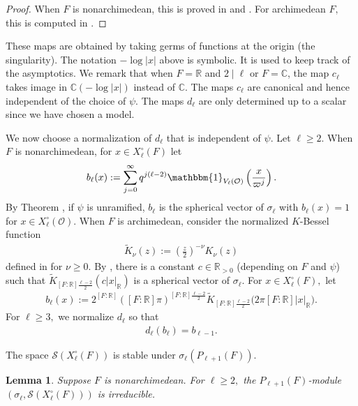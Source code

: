 \documentclass[11pt,a4paper,reqno]{amsart}
\newtheorem{lem}[thm]{Lemma}
\theoremstyle{remark}
\numberwithin{equation}{section}
\newcommand{\OO}{\mathcal{O}}
\newcommand{\CC}{\mathbb{C}}
\newcommand{\RR}{\mathbb{R}}
\theoremstyle{definition}
\numberwithin{equation}{section}
\newcommand{\one}{\mathbbm{1}}
\begin{document}
\begin{proof}
    When $F$ is nonarchimedean, this is proved in \cite{GK:cone} and \cite[Example 4.4.2]{Hsu:asymptotics}. For archimedean $F,$ this is computed in \cite[Example 5.4.2 and \S 5.5]{Hsu:asymptotics}.
\end{proof}

These maps are obtained by taking germs of functions at the origin (the singularity).  The notation $-\log |x|$ above is symbolic. It is used to keep track of the asymptotics. We remark that when $F=\RR$ and $2\mid \ell$ or $F=\CC$, the map $c_\ell$ takes image in $\CC(-\log |x|)$ instead of $\CC$. The maps $c_\ell$ are canonical and hence independent of the choice of $\psi$. The maps $d_\ell$ are only determined up to a scalar since we have chosen a model.

We now choose a normalization of $d_\ell$ that is independent of $\psi$. Let $\ell\ge 2$. When $F$ is nonarchimedean,  for $x\in X_\ell^\circ(F)$ let
\begin{align}\label{eq:basicnonarch}
    b_\ell(x):=\sum_{j=0}^\infty q^{j(\ell-2)}\one_{V_\ell(\OO)}\left(\frac{x}{\varpi^j} \right).
\end{align}
By Theorem \cite[Theorem 6.1]{SW:minimal}, if $\psi$ is unramified, $b_\ell$ is the spherical vector of $\sigma_\ell$ with $b_\ell(x)=1$ for $x\in X_\ell^\circ(\mathcal{O}).$
When $F$ is archimedean, consider the normalized  $K$-Bessel function
\begin{align*}
    \widetilde{K}_{\nu}(z):=\left(\frac{z}{2}\right)^{-\nu}K_{\nu}(z)
\end{align*}
defined in \cite[\S 7.2]{Kobayashi:Mano} for $\nu\ge 0$. By \cite[(2.14) and Theorem 2.19]{minrep:real}, there is a constant $c\in \RR_{>0}$ (depending on $F$ and $\psi$) such that $\widetilde{K}_{[F:\RR]\frac{\ell-2}{2}}(c|x|_\RR)$ is a spherical vector of $\sigma_\ell$. For $x\in X_\ell^\circ(F),$ let
\begin{align}\label{eq:basicarch}
    b_\ell(x):=2^{[F:\RR]}([F:\RR]\pi)^{[F:\RR]\frac{\ell-2}{2}}\widetilde{K}_{[F:\RR]\frac{\ell-2}{2}}\bigg(2\pi[F:\RR] |x|_\RR\bigg).
\end{align}
For $\ell\ge 3,$ we normalize $d_\ell$ so that \begin{align}\label{eq:dnormalize}
    d_{\ell}(b_\ell)=b_{\ell-1}.
\end{align}


The space $\mathcal{S}(X_\ell^\circ(F))$ is stable under $\sigma_\ell(P_{\ell+1}(F))$.
\begin{lem}\label{lem:Iact} 
Suppose $F$ is nonarchimedean. For $\ell\ge 2,$ the $P_{\ell+1}(F)$-module $(\sigma_\ell,\mathcal{S}(X_\ell^\circ(F)))$ is irreducible.
\end{lem}
\end{document}
